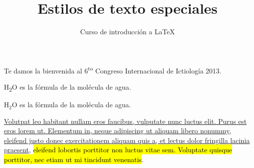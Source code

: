 \documentclass[10pt,letterpaper]{article}
\title{Estilos de texto especiales}
\author{Curso de introducción a LaTeX}
\begin{document}
 \maketitle
 Te damos la bienvenida al  6\textsuperscript{to} Congreso Internacional de Ictiología 2013.
 
 H\textsubscript{2}O es la fórmula de la molécula de agua.
 
 H$_2$O es la fórmula de la molécula de agua.
 
 \ul{Volutpat leo habitant nullam eros faucibus, vulputate nunc luctus elit. Purus est eros lorem ut. Elementum in, neque adipiscing ut aliquam libero nonummy, eleifend justo donec exercitationem aliquam quis a, et lectus dolor fringilla lacinia praesent}, \hl{eleifend lobortis porttitor non luctus vitae sem. Voluptate quisque porttitor, nec etiam ut mi tincidunt venenatis}.
\end{document}
